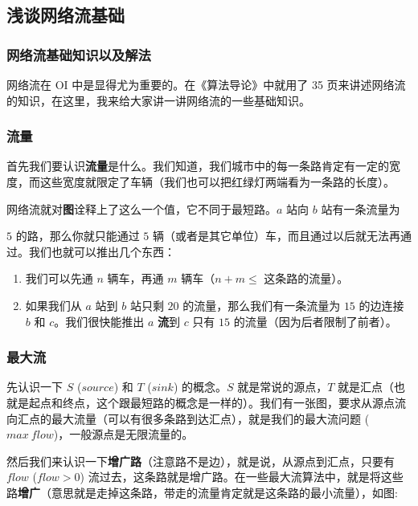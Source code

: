 
\subsection{浅谈网络流基础}

\subsubsection{网络流基础知识以及解法}

网络流在 OI 中是显得尤为重要的。在《算法导论》中就用了 35 页来讲述网络流的知识，在这里，我来给大家讲一讲网络流的一些基础知识。

\subsubsection{流量}

首先我们要认识\textbf{流量}是什么。我们知道，我们城市中的每一条路肯定有一定的宽度，而这些宽度就限定了车辆（我们也可以把红绿灯两端看为一条路的长度）。

网络流就对\textbf{图}诠释上了这么一个值，它不同于最短路。$a$ 站向 $b$ 站有一条流量为

 $5$ 的路，那么你就只能通过 $5$ 辆（或者是其它单位）车，而且通过以后就无法再通过。我们也就可以推出几个东西：

\begin{enumerate}
\item 我们可以先通 $n$ 辆车，再通 $m$ 辆车（$n+m\le$ 这条路的流量）。
\item 如果我们从 $a$ 站到 $b$ 站只剩 $20$ 的流量，那么我们有一条流量为 $15$ 的边连接 $b$ 和 $c$。我们很快能推出 $a$ \textbf{流}到 $c$ 只有 $15$ 的流量（因为后者限制了前者）。
\end{enumerate}

\subsubsection{最大流}

先认识一下 $S$ ($source$) 和 $T$ ($sink$) 的概念。$S$ 就是常说的源点，$T$ 就是汇点（也就是起点和终点，这个跟最短路的概念是一样的）。我们有一张图，要求从源点流向汇点的最大流量（可以有很多条路到达汇点），就是我们的最大流问题 ($max\ flow$)，一般源点是无限流量的。

然后我们来认识一下\textbf{增广路}（注意路不是边），就是说，从源点到汇点，只要有 $flow$ ($flow>0$) 流过去，这条路就是增广路。在一些最大流算法中，就是将这些路\textbf{增广}（意思就是走掉这条路，带走的流量肯定就是这条路的最小流量），如图:

